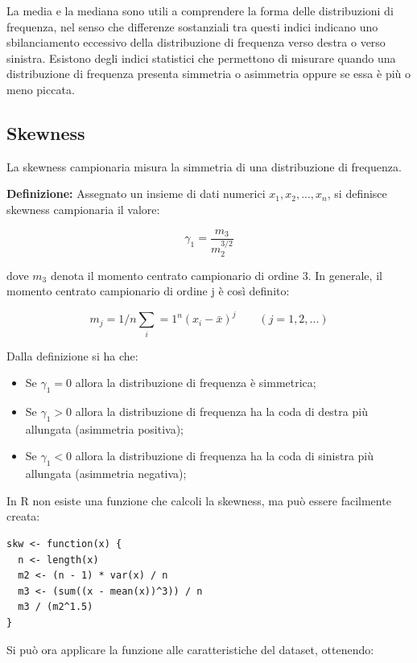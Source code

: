 La media e  la mediana sono utili a comprendere la forma delle distribuzioni di frequenza, nel senso che differenze sostanziali tra questi indici indicano uno sbilanciamento eccessivo della distribuzione di frequenza verso destra o verso sinistra. Esistono degli indici statistici che permettono di misurare quando una distribuzione di frequenza presenta simmetria o asimmetria oppure se essa è più o meno piccata.

\subsection{Skewness}\label{cap3.3.1}

La skewness campionaria misura la simmetria di una distribuzione di frequenza.

\noindent \textbf{Definizione:} Assegnato un insieme di dati numerici $x_1, x_2, ..., x_n$, si definisce skewness campionaria il valore:

\[\gamma_1 = \frac{m_3}{m_2^{3/2}}\]

dove $m_3$ denota il momento centrato campionario di ordine 3. In generale, il momento centrato campionario di ordine j è così definito:

\[m_j = 1/n \sum_i=1^n (x_i - \bar x)^j \quad \quad (j = 1, 2, ...)\]

Dalla definizione si ha che:

\begin{itemize}
\item Se $\gamma_1 = 0$ allora la distribuzione di frequenza è simmetrica;
\item Se $\gamma_1 > 0$ allora la distribuzione di frequenza ha la coda di destra più allungata (asimmetria positiva);
\item Se $\gamma_1 < 0$ allora la distribuzione di frequenza ha la coda di sinistra più allungata (asimmetria negativa);
\end{itemize}

In R non esiste una funzione che calcoli la skewness, ma può essere facilmente creata:

\vspace{5mm}
\begin{lstlisting}
skw <- function(x) {
  n <- length(x)
  m2 <- (n - 1) * var(x) / n
  m3 <- (sum((x - mean(x))^3)) / n
  m3 / (m2^1.5)
}
\end{lstlisting}
\vspace{5mm}

Si può ora applicare la funzione alle caratteristiche del dataset, ottenendo:

